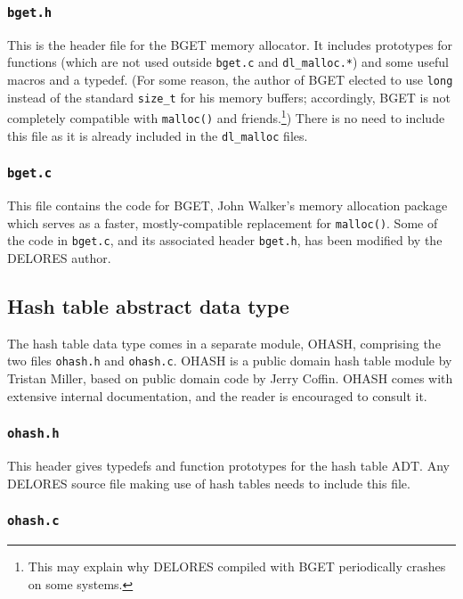 \documentclass[a4paper,10pt,twocolumn]{article}
\begin{document}
\subsubsection{\texttt{bget.h}}
  
This is the header file for the BGET memory allocator. It includes
prototypes for functions (which are not used outside \texttt{bget.c}
and \texttt{dl\_malloc.*}) and some useful macros and a typedef. (For
some reason, the author of BGET elected to use \texttt{long} instead
of the standard \texttt{size\_t} for his memory buffers; accordingly,
BGET is not completely compatible with \texttt{malloc()} and
friends.\footnote{This may explain why DELORES compiled with BGET
  periodically crashes on some systems.})  There is no need to include
this file as it is already included in the \texttt{dl\_malloc} files.
  
\subsubsection{\texttt{bget.c}}
  
This file contains the code for BGET, John Walker's memory allocation
package which serves as a faster, mostly-compatible replacement for
\texttt{malloc()}. Some of the code in \texttt{bget.c}, and its
associated header \texttt{bget.h}, has been modified by the DELORES author.


\subsection{Hash table abstract data type}

The hash table data type comes in a separate module, OHASH, comprising
the two files \texttt{ohash.h} and \texttt{ohash.c}. OHASH is a public
domain hash table module by Tristan Miller, based on public domain
code by Jerry Coffin.  OHASH comes with extensive internal
documentation, and the reader is encouraged to consult it.

\subsubsection{\texttt{ohash.h}}
  
This header gives typedefs and function prototypes for the hash table
ADT. Any DELORES source file making use of hash tables needs to
include this file.
  
\subsubsection{\texttt{ohash.c}}
  
\end{document}
